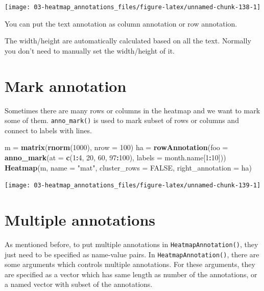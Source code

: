 \documentclass[]{book}
\newenvironment{Shaded}{\begin{snugshade}}{\end{snugshade}}
\newcommand{\KeywordTok}[1]{\textcolor[rgb]{0.13,0.29,0.53}{\textbf{#1}}}
\newcommand{\DataTypeTok}[1]{\textcolor[rgb]{0.13,0.29,0.53}{#1}}
\newcommand{\DecValTok}[1]{\textcolor[rgb]{0.00,0.00,0.81}{#1}}
\newcommand{\StringTok}[1]{\textcolor[rgb]{0.31,0.60,0.02}{#1}}
\newcommand{\OtherTok}[1]{\textcolor[rgb]{0.56,0.35,0.01}{#1}}
\newcommand{\OperatorTok}[1]{\textcolor[rgb]{0.81,0.36,0.00}{\textbf{#1}}}
\newcommand{\NormalTok}[1]{#1}
\theoremstyle{definition}
\theoremstyle{definition}
\theoremstyle{definition}
\theoremstyle{remark}
\begin{document}
\begin{center}\texttt{[image: 03-heatmap\_annotations\_files/figure-latex/unnamed-chunk-138-1]} \end{center}

You can put the text annotation as column annotation or row annotation.

The width/height are automatically calculated based on all the text.
Normally you don't need to manually set the width/height of it.

\section{Mark annotation}\label{mark-annotation}

Sometimes there are many rows or columns in the heatmap and we want to
mark some of them. \texttt{anno\_mark()} is used to mark subset of rows
or columns and connect to labels with lines.

\begin{Shaded}
\begin{Highlighting}[]
\NormalTok{m =}\StringTok{ }\KeywordTok{matrix}\NormalTok{(}\KeywordTok{rnorm}\NormalTok{(}\DecValTok{1000}\NormalTok{), }\DataTypeTok{nrow =} \DecValTok{100}\NormalTok{)}
\NormalTok{ha =}\StringTok{ }\KeywordTok{rowAnnotation}\NormalTok{(}\DataTypeTok{foo =} \KeywordTok{anno_mark}\NormalTok{(}\DataTypeTok{at =} \KeywordTok{c}\NormalTok{(}\DecValTok{1}\OperatorTok{:}\DecValTok{4}\NormalTok{, }\DecValTok{20}\NormalTok{, }\DecValTok{60}\NormalTok{, }\DecValTok{97}\OperatorTok{:}\DecValTok{100}\NormalTok{), }\DataTypeTok{labels =}\NormalTok{ month.name[}\DecValTok{1}\OperatorTok{:}\DecValTok{10}\NormalTok{]))}
\KeywordTok{Heatmap}\NormalTok{(m, }\DataTypeTok{name =} \StringTok{"mat"}\NormalTok{, }\DataTypeTok{cluster_rows =} \OtherTok{FALSE}\NormalTok{, }\DataTypeTok{right_annotation =}\NormalTok{ ha)}
\end{Highlighting}
\end{Shaded}

\begin{center}\texttt{[image: 03-heatmap\_annotations\_files/figure-latex/unnamed-chunk-139-1]} \end{center}

\section{Multiple annotations}\label{multiple-annotations}

As mentioned before, to put multiple annotations in
\texttt{HeatmapAnnotation()}, they just need to be specified as
name-value pairs. In \texttt{HeatmapAnnotation()}, there are some
arguments which controls multiple annotations. For these arguments, they
are specified as a vector which has same length as number of the
annotations, or a named vector with subset of the annotations.
\end{document}
